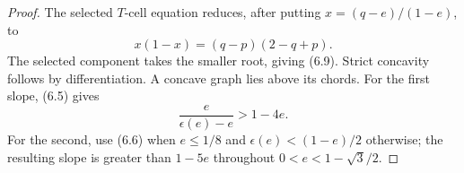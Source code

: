 \begin{proof}
The selected $T$-cell equation reduces, after putting
$x=(q-e)/(1-e)$, to
\[
 x(1-x)=(q-p)(2-q+p).
\]
The selected component takes the smaller root, giving (6.9).  Strict
concavity follows by differentiation.  A concave graph lies above its chords.
For the first slope, (6.5) gives
\[
 \frac{e}{\epsilon(e)-e}>1-4e.
\]
For the second, use (6.6) when $e\le1/8$ and
$\epsilon(e)<(1-e)/2$ otherwise; the resulting slope is greater than
$1-5e$ throughout $0<e<1-\sqrt3/2$.
\end{proof}

